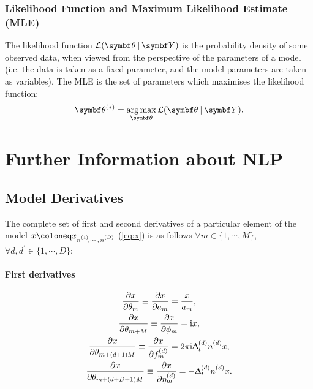 \subsubsection{Likelihood Function and Maximum Likelihood Estimate (\acs{MLE})}
The likelihood function $\mathcal{L}(\bdthY)$ is the probability density of
some observed data, when viewed from the perspective of the parameters of a
model (i.e. the data is taken as a fixed parameter, and the model parameters
are taken as variables). The \ac{MLE} is the set of parameters which maximises
the likelihood function:
\begin{equation}
    \bthstar = \argmax_{\bth} \mathcal{L}(\bdthY).
\end{equation}

\section{Further Information about \acs{NLP}}
\subsection{Model Derivatives}
\label{sec:derivatives}
The complete set of first and second derivatives of a particular element of the
model $x \coloneq \xnonenD$ (\cref{eq:x}) is as follows
$\forall m \in \lbrace 1, \cdots, M \rbrace$,
$\forall d, d^{\prime} \in \lbrace 1, \cdots, D \rbrace$:
\paragraph{First derivatives}
\begin{subequations}
    \begin{gather}
        \xderiv{\theta_m} \equiv
            \xderiv{a_m} =
            \frac{x}{a_m},
            \label{eq:deriv-a}\\
        \xderiv{\theta_{m + M}} \equiv
            \xderiv{\phi_m} =
            \iu x,\\
        \xderiv{\theta_{m + (d + 1)M}} \equiv
            \xderiv{\fdm} =
            2 \pi \iu \Dtd \nd x,\\
        \xderiv{\theta_{m + (d + D + 1)M}} \equiv
            \xderiv{\etadm} =
            - \Dtd \nd x.
    \end{gather}
    \label{eq:first-derivs}
\end{subequations}
